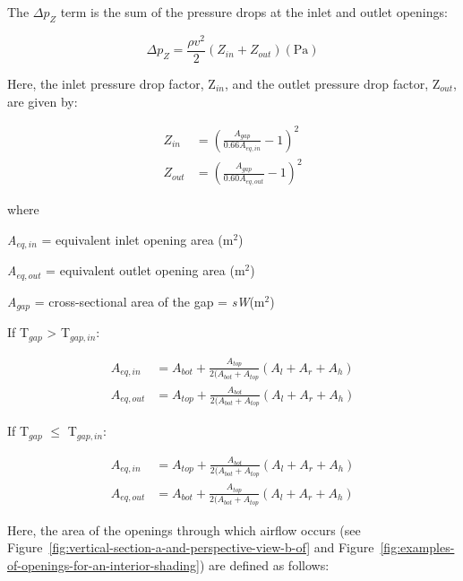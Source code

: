 The \(\Delta p_Z\) term is the sum of the pressure drops at the inlet and outlet openings:

\begin{equation}
\Delta {p_Z} = \frac{{\rho {v^2}}}{2}\left( {{Z_{in}} + {Z_{out}}} \right){\mathrm{    (Pa)}}
\end{equation}

Here, the inlet pressure drop factor, Z\(_{in}\), and the outlet pressure drop factor, Z\(_{out}\), are given by:

\begin{equation}
  \begin{array}{rl}
    Z_{in}  & = \left( \frac{A_{gap}}{0.66A_{eq,in}}  - 1 \right)^2 \\
    Z_{out} & = \left( \frac{A_{gap}}{0.60A_{eq,out}} - 1 \right)^2
  \end{array}
\end{equation}

where

\emph{A\(_{eq,in}\)} = equivalent inlet opening area (m\(^{2}\))

\emph{A\(_{eq,out}\)} = equivalent outlet opening area (m\(^{2}\))

\emph{A\(_{gap}\)} = cross-sectional area of the gap = \emph{sW}(m\(^{2}\))

If T\(_{gap}\) \textgreater{} T\(_{gap,in}\):

\begin{equation}
  \begin{array}{rl}
    A_{eq,in}  & = A_{bot} + \frac{A_{top}}{2(A_{bot}+A_{top}} \left( A_l + A_r + A_h \right) \\
    A_{eq,out} & = A_{top} + \frac{A_{bot}}{2(A_{bot}+A_{top}} \left( A_l + A_r + A_h \right)
  \end{array}
\end{equation}

If T\(_{gap}\) \(\leq\) T\(_{gap,in}\):

\begin{equation}
  \begin{array}{rl}
    A_{eq,in}  & = A_{top} + \frac{A_{bot}}{2(A_{bot}+A_{top}} \left( A_l + A_r + A_h \right) \\
    A_{eq,out} & = A_{bot} + \frac{A_{top}}{2(A_{bot}+A_{top}} \left( A_l + A_r + A_h \right)
  \end{array}
\end{equation}

Here, the area of the openings through which airflow occurs (see Figure~\ref{fig:vertical-section-a-and-perspective-view-b-of} and Figure~\ref{fig:examples-of-openings-for-an-interior-shading}) are defined as follows:

